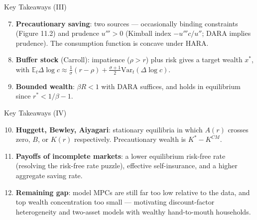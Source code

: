 \documentclass[blue]{beamer}
\newcommand{\E}{\mathbb{E}}
\begin{document}
	\begin{frame}{Key Takeaways (III)}
		\begin{enumerate}
			\setcounter{enumi}{6}
			\item \textbf{Precautionary saving}: two sources --- occasionally binding constraints (Figure 11.2) and prudence $u''' > 0$ (Kimball index $-u'''c/u''$; DARA implies prudence). The consumption function is concave under HARA.
			
			\item \textbf{Buffer stock} (Carroll): impatience ($\rho > r$) plus risk gives a target wealth $x^*$, with $\E_t \Delta\log c \approx \frac{1}{\sigma}(r-\rho) + \frac{\sigma+1}{2}\text{Var}_t(\Delta\log c)$.
			
			\item \textbf{Bounded wealth}: $\beta R < 1$ with DARA suffices, and holds in equilibrium since $r^* < 1/\beta - 1$.
		\end{enumerate}
	\end{frame}
	
	\begin{frame}{Key Takeaways (IV)}
		\begin{enumerate}
			\setcounter{enumi}{9}
			\item \textbf{Huggett, Bewley, Aiyagari}: stationary equilibria in which $A(r)$ crosses zero, $B$, or $K(r)$ respectively. Precautionary wealth is $K^* - K^{CM}$.
			
			\item \textbf{Payoffs of incomplete markets}: a lower equilibrium risk-free rate (resolving the risk-free rate puzzle), effective self-insurance, and a higher aggregate saving rate.
			
			\item \textbf{Remaining gap}: model MPCs are still far too low relative to the data, and top wealth concentration too small --- motivating discount-factor heterogeneity and two-asset models with wealthy hand-to-mouth households.
		\end{enumerate}
	\end{frame}
	
\end{document}
